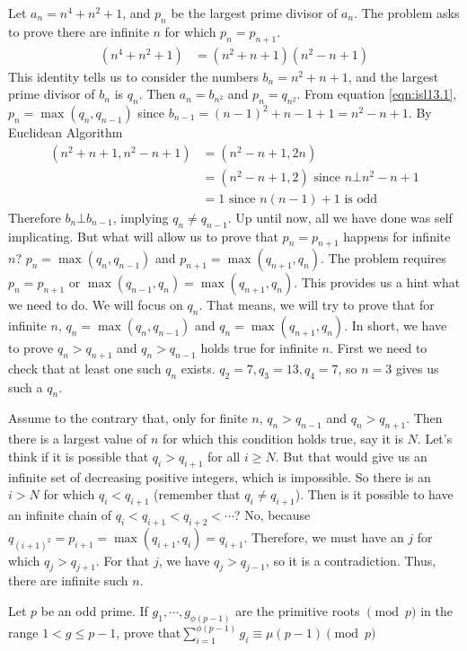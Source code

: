 \documentclass[problems.tex]{subfile}
\begin{document}
	\begin{solution}
		Let $a_n=n^4+n^2+1$, and $p_n$ be the largest prime divisor of $a_n$. The problem asks to prove there are infinite $n$ for which $p_n=p_{n+1}$.
			\begin{align}
				(n^4+n^2+1) & = (n^2+n+1)(n^2-n+1)\label{eqn:isl13.1}
			\end{align}
		This identity tells us to consider the numbers $b_n=n^2+n+1$, and the largest prime divisor of $b_n$ is $q_n$. Then $a_n=b_{n^2}$ and $p_n=q_{n^2}$. From equation \eqref{eqn:isl13.1}, $p_n=\max(q_n,q_{n-1})$ since $b_{n-1}=(n-1)^2+n-1+1=n^2-n+1$. By Euclidean Algorithm
			\begin{align*}
				(n^2+n+1,n^2-n+1) & = (n^2-n+1,2n)\\
								  & = (n^2-n+1,2)\text { since }n\bot n^2-n+1\\
								  & = 1\text { since }n(n-1)+1\text { is odd}
			\end{align*}
		Therefore $b_n\bot b_{n-1}$, implying $q_n\neq q_{n-1}$. Up until now, all we have done was self implicating. But what will allow us to prove that $p_n=p_{n+1}$ happens for infinite $n$? $p_n=\max(q_n,q_{n-1})$ and $p_{n+1}=\max(q_{n+1},q_n)$. The problem requires $p_n=p_{n+1}$ or $\max(q_{n-1},q_n)=\max(q_{n+1},q_n)$. This provides us a hint what we need to do. We will focus on $q_n$. That means, we will try to prove that for infinite $n$, $q_n=\max(q_n,q_{n-1})$ and $q_n=\max(q_{n+1},q_n)$. In short, we have to prove $q_n>q_{n+1}$ and $q_n>q_{n-1}$ holds true for infinite $n$. First we need to check that at least one such $q_n$ exists. $q_2=7,q_3=13,q_4=7$, so $n=3$ gives us such a $q_n$.
		
		Assume to the contrary that, only for finite $n$, $q_n>q_{n-1}$ and $q_n>q_{n+1}$. Then there is a largest value of $n$ for which this condition holds true, say it is $N$. Let's think if it is possible that $q_i>q_{i+1}$ for all $i\geq N$. But that would give us an infinite set of decreasing positive integers, which is impossible. So there is an $i>N$ for which $q_i<q_{i+1}$ (remember that $q_i\neq q_{i+1}$). Then is it possible to have an infinite chain of $q_i<q_{i+1}<q_{i+2}<\cdots$? No, because $q_{(i+1)^2}=p_{i+1}=\max(q_{i+1},q_i)=q_{i+1}$. Therefore, we must have an $j$ for which $q_j>q_{j+1}$. For that $j$, we have $q_j>q_{j-1}$, so it is a contradiction. Thus, there are infinite such $n$.
	\end{solution}
	
	\begin{problem}
		Let $p$ be an odd prime. If $g_{1}, \cdots, g_{\phi(p-1)}$ are the primitive roots $\pmod{p}$ in the range $1<g \le p-1$, prove that$ \sum_{i=1}^{\phi(p-1)}g_{i}\equiv \mu(p-1) \pmod{p}$
	\end{problem}
	
\end{document}
